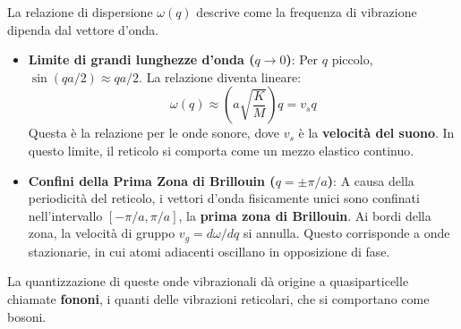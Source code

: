 La relazione di dispersione \(\omega(q)\) descrive come la frequenza di vibrazione dipenda dal vettore d'onda.
\begin{itemize}
    \item \textbf{Limite di grandi lunghezze d'onda (\(q \to 0\))}: Per \(q\) piccolo, \(\sin(qa/2) \approx qa/2\). La relazione diventa lineare:
    \[ \omega(q) \approx \left( a\sqrt{\frac{K}{M}} \right) q = v_s q \]
    Questa è la relazione per le onde sonore, dove \(v_s\) è la \textbf{velocità del suono}. In questo limite, il reticolo si comporta come un mezzo elastico continuo.
    \item \textbf{Confini della Prima Zona di Brillouin (\(q = \pm \pi/a\))}: A causa della periodicità del reticolo, i vettori d'onda fisicamente unici sono confinati nell'intervallo \([-\pi/a, \pi/a]\), la \textbf{prima zona di Brillouin}. Ai bordi della zona, la velocità di gruppo \(v_g = d\omega/dq\) si annulla. Questo corrisponde a onde stazionarie, in cui atomi adiacenti oscillano in opposizione di fase.
\end{itemize}
La quantizzazione di queste onde vibrazionali dà origine a quasiparticelle chiamate \textbf{fononi}, i quanti delle vibrazioni reticolari, che si comportano come bosoni.

